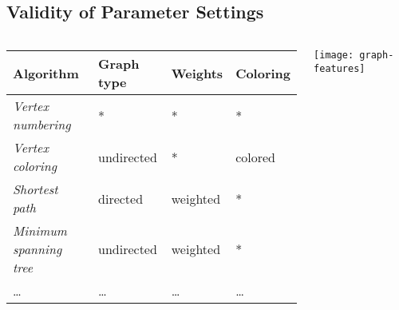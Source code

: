 \subsection{Validity of Parameter Settings}
\begin{frame}{\myframetitle}
	\begin{columns}
			\begin{tabular}{llll}
			\toprule
			{\bf Algorithm} 							& {\bf Graph type} 	& {\bf Weights} & {\bf Coloring}  \\ \midrule
			{\em Vertex numbering}			  & *          				& *        			& *         			\\
			{\em Vertex coloring}       	& undirected 				& *        			& colored   			\\
			{\em Shortest path}        		& directed   				& weighted 			& *         			\\
			{\em Minimum spanning tree} 	& undirected 				& weighted 			& *         			\\
			\ldots         					& \ldots 			 			& \ldots 		  	& \ldots 					\\ \bottomrule
			\end{tabular}
			\vspace{5mm}	
			\texttt{[image: graph-features]}
	\end{columns}
\end{frame}

